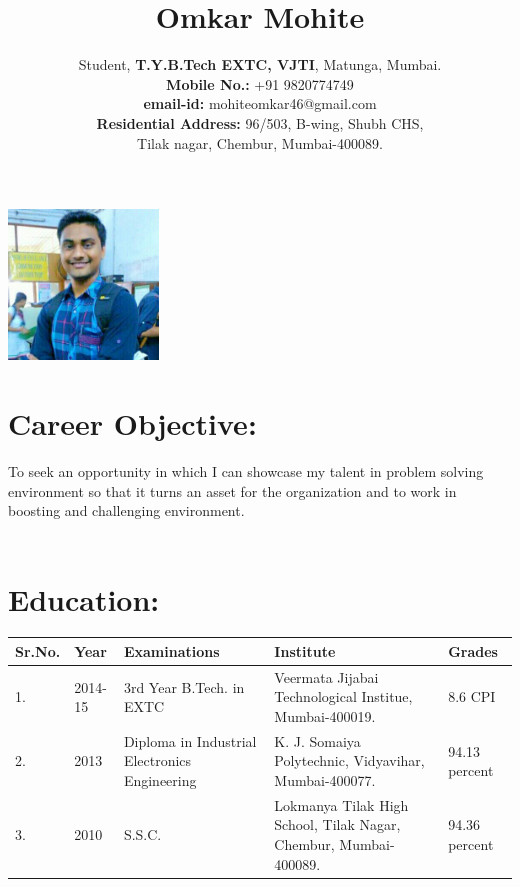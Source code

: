 \documentclass[a4 paper,12pt]{article}
\title{\bfseries\Huge Omkar Mohite}
\author{Student, \textbf{T.Y.B.Tech EXTC, VJTI}, Matunga, Mumbai.\\\textbf{Mobile No.:} +91 9820774749\\\textbf{email-id:} mohiteomkar46@gmail.com\\\textbf{Residential Address:} 96/503, B-wing, Shubh CHS,\\ Tilak nagar, Chembur, Mumbai-400089.\\}
\date{}
\begin{document}
	\begin{minipage}{0.75\textwidth}
		\begingroup
		\let\endcenter\endflushleft
		\maketitle
		\endgroup
	\end{minipage}
	\begin{minipage}{0.2\textwidth}
		\graphicspath{ {images/} }
		\includegraphics[width=4cm, height=4cm]{IMG-20140509-WA0002}
	\end{minipage}


\begin{minipage}{0.98\textwidth}
	\section{Career Objective:}
	\vspace{-0.1in}
	To seek an opportunity in which I can showcase my talent in problem solving environment so that it turns an asset for the organization and to work in boosting and challenging environment.\\\\
\end{minipage}

\begin{minipage}{0.98\textwidth}
\section{Education:}
\vspace{-0.1in}
\begin{center}
	\begin{tabular}{|p{1.5cm}|p{2cm}|p{5cm}|p{4.5cm}|p{2.5cm}|}
		\hline
		\textbf{Sr.No.} & \textbf{Year} & \textbf{Examinations} & \textbf{Institute} & \textbf{Grades}\\ [0.5ex] 
		\hline
		1. & 2014-15 &3rd Year B.Tech. in EXTC & Veermata Jijabai Technological Institue, Mumbai-400019. & 8.6 CPI \\ 
		\hline
		2. & 2013 & Diploma in Industrial Electronics Engineering & K. J. Somaiya Polytechnic, Vidyavihar, Mumbai-400077.& 94.13 percent \\
		\hline
		3. & 2010 & S.S.C. & Lokmanya Tilak High School, Tilak Nagar, Chembur, Mumbai-400089. & 94.36 percent \\
		\hline
		
	\end{tabular}
\end{center}
\end{minipage}
\end{document}
